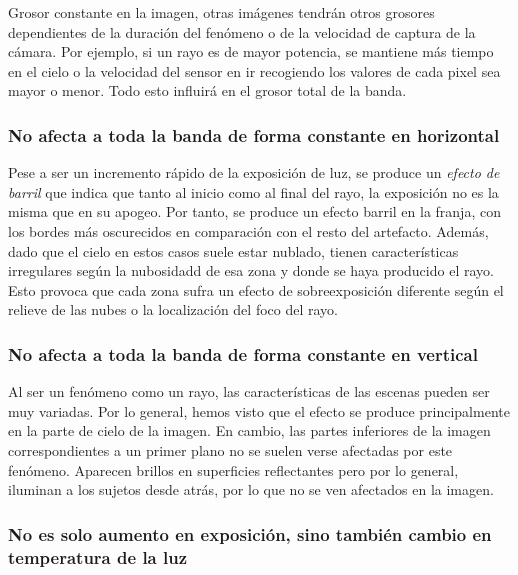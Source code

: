 \documentclass[11pt]{article}
\begin{document}
Grosor constante en la imagen, otras imágenes tendrán otros grosores
dependientes de la duración del fenómeno o de la velocidad de captura de
la cámara. Por ejemplo, si un rayo es de mayor potencia, se mantiene más
tiempo en el cielo o la velocidad del sensor en ir recogiendo los
valores de cada pixel sea mayor o menor. Todo esto influirá en el grosor
total de la banda.

\hypertarget{no-afecta-a-toda-la-banda-de-forma-constante-en-horizontal}{%
\subsubsection{No afecta a toda la banda de forma constante en
horizontal}\label{no-afecta-a-toda-la-banda-de-forma-constante-en-horizontal}}

Pese a ser un incremento rápido de la exposición de luz, se produce un
\emph{efecto de barril} que indica que tanto al inicio como al final del
rayo, la exposición no es la misma que en su apogeo. Por tanto, se
produce un efecto barril en la franja, con los bordes más oscurecidos en
comparación con el resto del artefacto. Además, dado que el cielo en
estos casos suele estar nublado, tienen características irregulares
según la nubosidadd de esa zona y donde se haya producido el rayo. Esto
provoca que cada zona sufra un efecto de sobreexposición diferente según
el relieve de las nubes o la localización del foco del rayo.

\hypertarget{no-afecta-a-toda-la-banda-de-forma-constante-en-vertical}{%
\subsubsection{No afecta a toda la banda de forma constante en
vertical}\label{no-afecta-a-toda-la-banda-de-forma-constante-en-vertical}}

Al ser un fenómeno como un rayo, las características de las escenas
pueden ser muy variadas. Por lo general, hemos visto que el efecto se
produce principalmente en la parte de cielo de la imagen. En cambio, las
partes inferiores de la imagen correspondientes a un primer plano no se
suelen verse afectadas por este fenómeno. Aparecen brillos en
superficies reflectantes pero por lo general, iluminan a los sujetos
desde atrás, por lo que no se ven afectados en la imagen.

\hypertarget{no-es-solo-aumento-en-exposiciuxf3n-sino-tambiuxe9n-cambio-en-temperatura-de-la-luz}{%
\subsubsection{No es solo aumento en exposición, sino también cambio en
temperatura de la
luz}\label{no-es-solo-aumento-en-exposiciuxf3n-sino-tambiuxe9n-cambio-en-temperatura-de-la-luz}}
\end{document}
